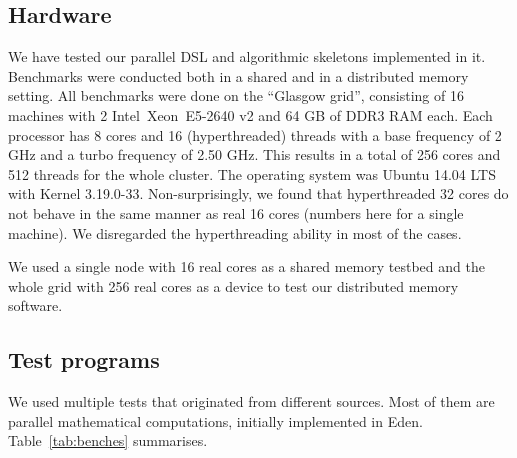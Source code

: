 \newcommand{\speedupdiffplot}[7]{
\begin{tikzpicture}
\begin{axis}[title={#1},
title style={align=center},
scale only axis, width=#7,
xlabel=Threads,
xtick distance=#4,
ytick distance=0.5,
ylabel=Absolute speedup difference,
ylabel near ticks,
grid=major,
legend entries={#2},
legend style={at={(0.99,0.99)},anchor=north east},
max space between ticks=50pt,
grid style={line width=.1pt, draw=gray!10},
major grid style={line width=.2pt,draw=gray!50},
xmin=-1,
xmax=#6]
#5
\end{axis}
\end{tikzpicture}
}

\subsection{Hardware}

We have tested our parallel DSL and algorithmic skeletons implemented
in it. Benchmarks were conducted both in a shared and in a distributed
memory setting. All benchmarks were done on the ``Glasgow grid'', consisting of
16 machines with 2 Intel\SymbReg~Xeon\SymbReg~E5-2640 v2 and 64 GB of DDR3 RAM each. Each processor has 8 cores and 16 (hyperthreaded) threads with a base frequency of 2 GHz and a turbo frequency of 2.50 GHz. This results in a total of 256 cores and 512 threads for the whole cluster. The operating system was Ubuntu 14.04 LTS with Kernel 3.19.0-33. Non-surprisingly, we found that hyperthreaded 32 cores do not behave in the same manner as real 16 cores (numbers here for a single machine). We disregarded the hyperthreading ability in most of the
cases.

We used a single node with 16 real cores as a shared memory testbed
and the whole grid with 256 real cores as a device to test our
distributed memory software.

\subsection{Test programs}

We used multiple tests that originated from different
sources. Most of them are parallel mathematical computations, initially
implemented in Eden. Table~\ref{tab:benches} summarises.

